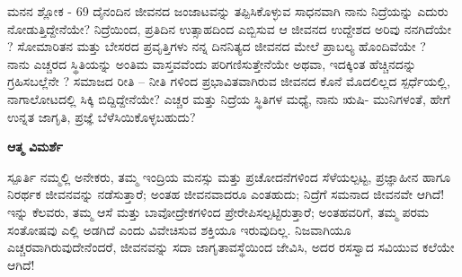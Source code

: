 \begin{mananam}{\mananamfont ಮನನ ಶ್ಲೋಕ - \textenglish{69}}
\footnotesize \mananamtext ದೈನಂದಿನ ಜೀವನದ ಜಂಜಾಟವನ್ನು ತಪ್ಪಿಸಿಕೊಳ್ಳುವ ಸಾಧನವಾಗಿ ನಾನು ನಿದ್ರೆಯನ್ನು ಎದುರು ನೋಡುತ್ತಿದ್ದೇನೆಯೇ? ನಿದ್ರೆಯಿಂದ, ಪ್ರತಿದಿನ ಉತ್ಸಾಹದಿಂದ ಎಬ್ಬಿಸುವ ಆ  ಜೀವನದ ಉದ್ದೇಶದ ಅರಿವು ನನಗಿದೆಯೇ ?  ಸೋಮಾರಿತನ ಮತ್ತು ಬೇಸರದ ಪ್ರವೃತ್ತಿಗಳು ನನ್ನ ದಿನನಿತ್ಯದ ಜೀವನದ ಮೇಲೆ ಪ್ರಾಬಲ್ಯ ಹೊಂದಿವೆಯೇ ?\\
ನಾನು ಎಚ್ಚರದ ಸ್ಥಿತಿಯನ್ನು ಅಂತಿಮ ವಾಸ್ತವವೆಂದು ಪರಿಗಣಿಸುತ್ತೇನೆಯೇ ಅಥವಾ, ಇದಕ್ಕಿಂತ ಹೆಚ್ಚಿನದನ್ನು ಗ್ರಹಿಸಬಲ್ಲೆನೇ ? ಸಮಾಜದ ರೀತಿ – ನೀತಿ ಗಳಿಂದ ಪ್ರಭಾವಿತವಾಗಿರುವ ಜೀವನದ ಕೊನೆ ಮೊದಲಿಲ್ಲದ ಸ್ಪರ್ಧೆಯಲ್ಲಿ, ನಾಗಾಲೋಟದಲ್ಲಿ ಸಿಕ್ಕಿ ಬಿದ್ದಿದ್ದೇನೆಯೇ? ಎಚ್ಚರ ಮತ್ತು ನಿದ್ರೆಯ  ಸ್ಥಿತಿಗಳ  ಮಧ್ಯೆ,  ನಾನು ಋಷಿ- ಮುನಿಗಳಂತೆ,  ಹೇಗೆ ಉನ್ನತ ಜಾಗೃತಿ, ಪ್ರಜ್ಞೆ ಬೆಳೆಸಿಯಿಕೊಳ್ಳಬಹುದು?

\end{mananam}
\WritingHand\enspace\textbf{ಆತ್ಮ ವಿಮರ್ಶೆ}
\begin{inspiration}{\mananamfont ಸ್ಪೂರ್ತಿ}
\footnotesize \mananamtext ನಮ್ಮಲ್ಲಿ ಅನೇಕರು, ತಮ್ಮ ಇಂದ್ರಿಯ ಮನಸ್ಸು ಮತ್ತು ಪ್ರಚೋದನೆಗಳಿಂದ ಸೆಳೆಯಲ್ಪಟ್ಟ, ಪ್ರಜ್ಞಾಹೀನ ಹಾಗೂ ನಿರರ್ಥಕ   ಜೀವನವನ್ನು ನಡೆಸುತ್ತಾರೆ; ಅಂತಹ ಜೀವನವಾದರೂ ಎಂತಹುದು; ನಿದ್ರೆಗೆ ಸಮನಾದ ಜೀವನವೇ ಆಗಿದೆ! ಇನ್ನು ಕೆಲವರು, ತಮ್ಮ ಆಸೆ ಮತ್ತು ಬಾವೋದ್ರೇಕಗಳಿಂದ ಪ್ರೇರೇಪಿಸಲ್ಪಟ್ಟಿರುತ್ತಾರೆ; ಅಂತಹವರಿಗೆ, ತಮ್ಮ ಪರಮ ಸಂತೋಷವು ಎಲ್ಲಿ ಅಡಗಿದೆ ಎಂದು ವಿವೇಚಿಸುವ ಶಕ್ತಿಯೂ ಇರುವುದಿಲ್ಲ. ನಿಜವಾಗಿಯೂ ಎಚ್ಚರವಾಗಿರುವುದೇನೆಂದರೆ, ಜೀವನವನ್ನು ಸದಾ ಜಾಗೃತಾವಸ್ಥೆಯಿಂದ ಜೇವಿಸಿ, ಅದರ ರಸಸ್ವಾದ  ಸವಿಯುವ ಕಲೆಯೇ ಆಗಿದೆ!
\end{inspiration}
\newpage



